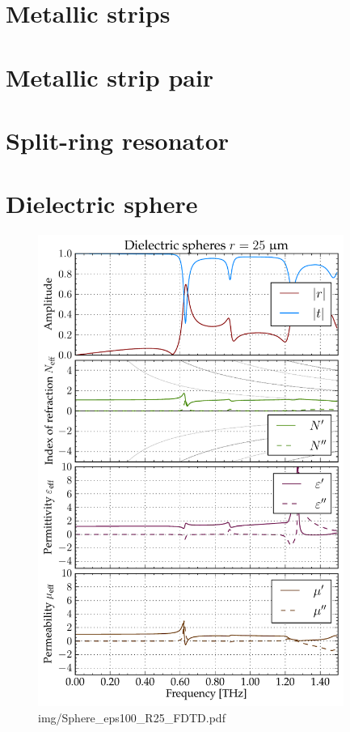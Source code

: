 \section{Metallic strips} %
\section{Metallic strip pair} %
\section{Split-ring resonator} %
\section{Dielectric sphere} %
\begin{figure} \caption{img/Sphere\_eps100\_R25\_FDTD.pdf}  \centering \includegraphics[width=10cm]{img/Sphere_eps100_R25_FDTD.pdf} \end{figure} \clearpage

